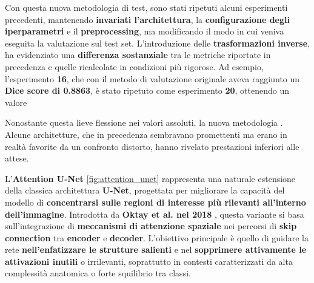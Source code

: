 
Con questa nuova metodologia di test, sono stati ripetuti alcuni esperimenti precedenti, mantenendo \textbf{invariati l’architettura}, la \textbf{configurazione degli iperparametri} e il \textbf{preprocessing}, ma modificando il modo in cui veniva eseguita la valutazione sul test set. L’introduzione delle \textbf{trasformazioni inverse}, ha evidenziato una \textbf{differenza sostanziale} tra le metriche riportate in precedenza e quelle ricalcolate in condizioni più rigorose. Ad esempio, l’esperimento \textbf{16}, che con il metodo di valutazione originale aveva raggiunto un \textbf{Dice score di 0.8863}, è stato ripetuto come esperimento \textbf{20}, ottenendo un valore  

Nonostante questa lieve flessione nei valori assoluti, la nuova metodologia . Alcune architetture, che in precedenza sembravano promettenti ma erano in realtà favorite da un confronto distorto, hanno rivelato prestazioni inferiori alle attese. %


L’\textbf{Attention U-Net} \ref{fig:attention_unet} rappresenta una naturale estensione della classica architettura \textbf{U-Net}, progettata per migliorare la capacità del modello di \textbf{concentrarsi sulle regioni di interesse  più rilevanti all’interno dell’immagine}. Introdotta da \textbf{Oktay et al. nel 2018} \cite{oktay2018attention}, questa variante si basa sull’integrazione di \textbf{meccanismi di attenzione spaziale} nei percorsi di \textbf{skip connection} tra \textbf{encoder} e \textbf{decoder}. L’obiettivo principale è quello di guidare la rete \textbf{nell’enfatizzare le strutture salienti} e nel \textbf{sopprimere attivamente le attivazioni inutili} o irrilevanti, soprattutto in contesti caratterizzati da alta complessità anatomica o forte squilibrio tra classi.

